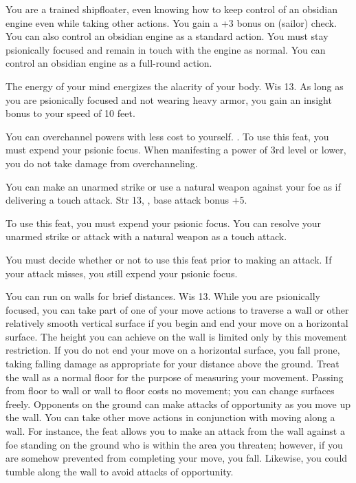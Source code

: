 {You are a trained shipfloater, even knowing how to keep control of an obsidian engine even while taking other actions.}
{}
{You gain a +3 bonus on  (sailor) check. You can also control an obsidian engine as a standard action. You must stay psionically focused and remain in touch with the engine as normal.}
{You can control an obsidian engine as a full-round action. }
{}

{The energy of your mind energizes the alacrity of your body.}
{Wis 13.}
{As long as you are psionically focused and not wearing heavy armor, you gain an insight bonus to your speed of 10 feet.}
{}{}

{You can overchannel powers with less cost to yourself.}
{.}
{To use this feat, you must expend your psionic focus. When manifesting a power of 3rd level or lower, you do not take damage from overchanneling.}
{}{}

{You can make an unarmed strike or use a natural weapon against your foe as if delivering a touch attack.}
{Str 13, , base attack bonus +5.}
{To use this feat, you must expend your psionic focus. You can resolve your unarmed strike or attack with a natural weapon as a touch attack.

You must decide whether or not to use this feat prior to making an attack. If your attack misses, you still expend your psionic focus.}
{}{}

{You can run on walls for brief distances.}
{Wis 13.}
{While you are psionically focused, you can take part of one of your move actions to traverse a wall or other relatively smooth vertical surface if you begin and end your move on a horizontal surface. The height you can achieve on the wall is limited only by this movement restriction. If you do not end your move on a horizontal surface, you fall prone, taking falling damage as appropriate for your distance above the ground. Treat the wall as a normal floor for the purpose of measuring your movement. Passing from floor to wall or wall to floor costs no movement; you can change surfaces freely. Opponents on the ground can make attacks of opportunity as you move up the wall.}
{}
{You can take other move actions in conjunction with moving along a wall. For instance, the  feat allows you to make an attack from the wall against a foe standing on the ground who is within the area you threaten; however, if you are somehow prevented from completing your move, you fall. Likewise, you could tumble along the wall to avoid attacks of opportunity.}

